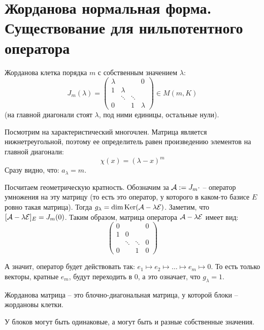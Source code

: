 \section{Жорданова нормальная форма. Существование для нильпотентного оператора}
\begin{conj}
    Жорданова клетка порядка $m$ с собственным значением $\lambda$: 
    \[ J_m(\lambda) = \left(\begin{array}{cccc}
    \lambda &  &  & 0 \\ 
    1 & \lambda &  &  \\ 
     & \ddots & \ddots &  \\ 
    0 &  & 1 & \lambda
    \end{array}\right) \in M(m, K) \]
    (на главной диагонали стоят $\lambda$, под ними единицы, остальные нули).
\end{conj}

\vspace*{3mm}

Посмотрим на характеристический многочлен.
Матрица является нижнетреугольной, поэтому ее определитель равен произведению элементов на главной диагонали:
    \[  \chi(x) = (\lambda - x)^m \]
Сразу видно, что: $a_{\lambda} = m$.

Посчитаем геометрическую кратность. 
Обозначим за $\mathcal{A} := J_m \cdot$ -- оператор умножения на эту матрицу (то есть это оператор, у которого в каком-то базисе $E$ ровно такая матрица).
Тогда $ g_{\lambda} = \dim \operatorname{Ker}(\mathcal{A} - \lambda\mathcal{E})$. 
Заметим, что $[\mathcal{A} - \lambda\mathcal{E}]_E = J_{m}(0)$.
Таким образом, матрица оператора $\mathcal{A} - \lambda\mathcal{E}$ имеет вид:
\[ \left(\begin{array}{cccc}
0 &  &  & 0 \\
1 & 0 &  &  \\
 & \ddots & \ddots & 0 \\ 
0 &  & 1 & 0
\end{array}\right) \]

А значит, оператор будет действовать так: $e_1 \mapsto e_2 \mapsto \dots \mapsto e_m \mapsto 0$.
То есть только векторы, кратные $e_m$, будут переходить в 0, а это означает, что $g_\lambda = 1$.

\vspace*{4mm}

\begin{conj}
    Жорданова матрица -- это блочно-диагональная матрица, у которой блоки -- жордановы клетки.
\end{conj}
У блоков могут быть одинаковые, а могут быть и разные собственные значения.

